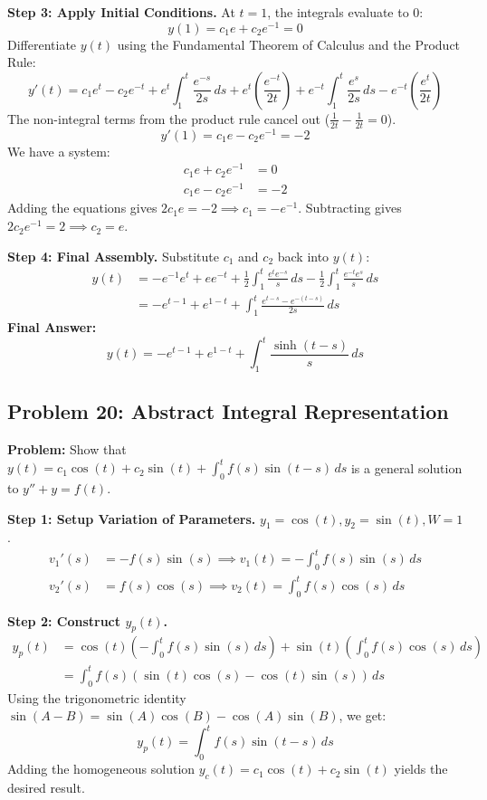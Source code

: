 \documentclass{article}
\begin{document}
\textbf{Step 3: Apply Initial Conditions.}
At $t=1$, the integrals evaluate to $0$:
\[ y(1) = c_1 e + c_2 e^{-1} = 0 \]
Differentiate $y(t)$ using the Fundamental Theorem of Calculus and the Product Rule:
\[ y'(t) = c_1 e^t - c_2 e^{-t} + e^t \int_1^t \frac{e^{-s}}{2s} \, ds + e^t \left(\frac{e^{-t}}{2t}\right) + e^{-t} \int_1^t \frac{e^s}{2s} \, ds - e^{-t} \left(\frac{e^t}{2t}\right) \]
The non-integral terms from the product rule cancel out ($\frac{1}{2t} - \frac{1}{2t} = 0$).
\[ y'(1) = c_1 e - c_2 e^{-1} = -2 \]
We have a system:
\begin{align*}
c_1 e + c_2 e^{-1} &= 0 \\
c_1 e - c_2 e^{-1} &= -2
\end{align*}
Adding the equations gives $2c_1 e = -2 \implies c_1 = -e^{-1}$.
Subtracting gives $2c_2 e^{-1} = 2 \implies c_2 = e$.

\textbf{Step 4: Final Assembly.}
Substitute $c_1$ and $c_2$ back into $y(t)$:
\begin{align*}
y(t) &= -e^{-1}e^t + e e^{-t} + \frac{1}{2} \int_1^t \frac{e^t e^{-s}}{s} \, ds - \frac{1}{2} \int_1^t \frac{e^{-t} e^s}{s} \, ds \\
&= -e^{t-1} + e^{1-t} + \int_1^t \frac{e^{t-s} - e^{-(t-s)}}{2s} \, ds
\end{align*}
\textbf{Final Answer:}
\[ y(t) = -e^{t-1} + e^{1-t} + \int_1^t \frac{\sinh(t-s)}{s} \, ds \]

\subsection{Problem 20: Abstract Integral Representation}
\textbf{Problem:} Show that $y(t) = c_1 \cos(t) + c_2 \sin(t) + \int_0^t f(s) \sin(t-s) \, ds$ is a general solution to $y'' + y = f(t)$.

\textbf{Step 1: Setup Variation of Parameters.}
$y_1 = \cos(t), y_2 = \sin(t), W = 1$.
\begin{align*}
v_1'(s) &= -f(s)\sin(s) \implies v_1(t) = -\int_0^t f(s)\sin(s) \, ds \\
v_2'(s) &= f(s)\cos(s) \implies v_2(t) = \int_0^t f(s)\cos(s) \, ds
\end{align*}

\textbf{Step 2: Construct $y_p(t)$.}
\begin{align*}
y_p(t) &= \cos(t) \left( -\int_0^t f(s)\sin(s) \, ds \right) + \sin(t) \left( \int_0^t f(s)\cos(s) \, ds \right) \\
&= \int_0^t f(s) \left( \sin(t)\cos(s) - \cos(t)\sin(s) \right) \, ds
\end{align*}
Using the trigonometric identity $\sin(A-B) = \sin(A)\cos(B) - \cos(A)\sin(B)$, we get:
\[ y_p(t) = \int_0^t f(s) \sin(t-s) \, ds \]
Adding the homogeneous solution $y_c(t) = c_1 \cos(t) + c_2 \sin(t)$ yields the desired result.
\end{document}

